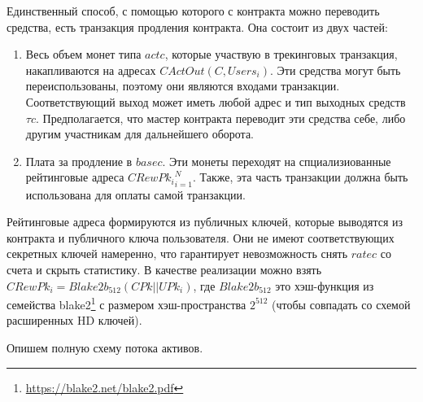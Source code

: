 \documentclass[specification,annotation]{itmo-student-thesis}
\begin{document}
Единственный способ, с помощью которого с контракта можно переводить
средства, есть транзакция продления контракта. Она состоит из двух частей:

\begin{enumerate}
\item Весь объем монет типа $actc$, которые участвую в трекинговых
  транзакция, накапливаются на адресах $CActOut(C,Users_i)$. Эти
  средства могут быть переиспользованы, поэтому они являются входами
  транзакции. Соответствующий выход может иметь любой адрес и тип
  выходных средств $\tau c$. Предполагается, что мастер контракта
  переводит эти средства себе, либо другим участникам для дальнейшего
  оборота.
\item Плата за продление в $basec$. Эти монеты переходят на
  спциализиованные рейтинговые адреса ${CRewPk_i}_{i=1}^N$. Также, эта часть
  транзакции должна быть использована для оплаты самой транзакции.
\end{enumerate}

Рейтинговые адреса формируются из публичных ключей, которые выводятся
из контракта и публичного ключа пользователя. Они не имеют
соответствующих секретных ключей намеренно, что гарантирует
невозможность снять $ratec$ со счета и скрыть статистику. В качестве
реализации можно взять $CRewPk_i = Blake2b_{512}(CPk || UPk_i)$, где
$Blake2b_{512}$ это хэш-функция из семейства
blake2\footnote{\url{https://blake2.net/blake2.pdf}} с размером
хэш-пространства $2^{512}$ (чтобы совпадать со схемой расширенных HD
ключей).

Опишем полную схему потока активов.
\end{document}
